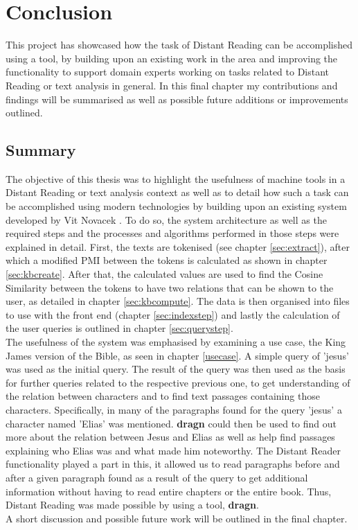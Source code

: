 \chapter{Conclusion}
This project has showcased how the task of Distant Reading can be accomplished using a tool, by building upon an existing work in the area and improving the functionality to support domain experts working on tasks related to Distant Reading or text analysis in general. In this final chapter my contributions and findings will be summarised as well as possible future additions or improvements outlined.
\section{Summary}
The objective of this thesis was to highlight the usefulness of machine tools in a Distant Reading or text analysis context as well as to detail how such a task can be accomplished using modern technologies by building upon an existing system developed by Vit Novacek \cite{novavcek2014skimmr}. To do so, the system architecture as well as the required steps and the processes and algorithms performed in those steps were explained in detail. First, the texts are tokenised (see chapter \ref{sec:extract}), after which a modified PMI between the tokens is calculated as shown in chapter \ref{sec:kbcreate}. After that, the calculated values are used to find the Cosine Similarity between the tokens to have two relations that can be shown to the user, as detailed in chapter \ref{sec:kbcompute}. The data is then organised into files to use with the front end (chapter \ref{sec:indexstep}) and lastly the calculation of the user queries is outlined in chapter \ref{sec:querystep}.\\
The usefulness of the system was emphasised by examining a use case, the King James version of the Bible, as seen in chapter \ref{usecase}. A simple query of 'jesus' was used as the initial query. The result of the query was then used as the basis for further queries related to the respective previous one, to get understanding of the relation between characters and to find text passages containing those characters. Specifically, in many of the paragraphs found for the query 'jesus' a character named 'Elias' was mentioned. \textbf{dragn} could then be used to find out more about the relation between Jesus and Elias as well as help find passages explaining who Elias was and what made him noteworthy. The Distant Reader functionality played a part in this, it allowed us to read paragraphs before and after a given paragraph found as a result of the query to get additional information without having to read entire chapters or the entire book. Thus, Distant Reading was made possible by using a tool, \textbf{dragn}.\\
A short discussion and possible future work will be outlined in the final chapter.
